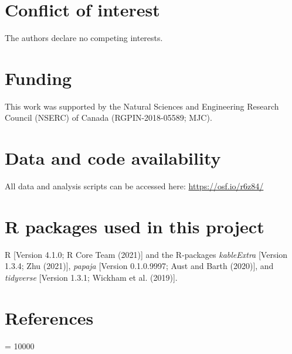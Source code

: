 \documentclass[
  english,
  man,floatsintext]{apa7}
\begin{document}
\hypertarget{conflict-of-interest}{%
\section{Conflict of interest}\label{conflict-of-interest}}

The authors declare no competing interests.

\hypertarget{funding}{%
\section{Funding}\label{funding}}

This work was supported by the Natural Sciences and Engineering Research Council (NSERC) of Canada (RGPIN-2018-05589; MJC).

\hypertarget{data-and-code-availability}{%
\section{Data and code availability}\label{data-and-code-availability}}

All data and analysis scripts can be accessed here: \url{https://osf.io/r6z84/}

\hypertarget{r-packages-used-in-this-project}{%
\section{R packages used in this project}\label{r-packages-used-in-this-project}}

R {[}Version 4.1.0; R Core Team (2021){]} and the R-packages \emph{kableExtra} {[}Version 1.3.4; Zhu (2021){]}, \emph{papaja} {[}Version 0.1.0.9997; Aust and Barth (2020){]}, and \emph{tidyverse} {[}Version 1.3.1; Wickham et al. (2019){]}.

\hypertarget{references}{%
\section{References}\label{references}}

\begingroup

\interlinepenalty = 10000 \setlength{\parindent}{-0.5in} \setlength{\leftskip}{0.5in}

\endgroup
\end{document}
